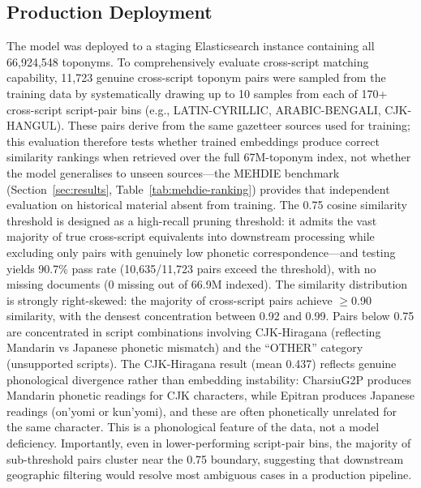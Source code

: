 \documentclass[11pt,a4paper]{article}
\begin{document}
\subsection{Production Deployment}

The model was deployed to a staging Elasticsearch instance containing all 66,924,548 toponyms. To comprehensively evaluate cross-script matching capability, 11,723 genuine cross-script toponym pairs were sampled from the training data by systematically drawing up to 10 samples from each of 170+ cross-script script-pair bins (e.g., LATIN-CYRILLIC, ARABIC-BENGALI, CJK-HANGUL). These pairs derive from the same gazetteer sources used for training; this evaluation therefore tests whether trained embeddings produce correct similarity rankings when retrieved over the full 67M-toponym index, not whether the model generalises to unseen sources---the MEHDIE benchmark (Section~\ref{sec:results}, Table~\ref{tab:mehdie-ranking}) provides that independent evaluation on historical material absent from training. The 0.75 cosine similarity threshold is designed as a high-recall pruning threshold: it admits the vast majority of true cross-script equivalents into downstream processing while excluding only pairs with genuinely low phonetic correspondence---and testing yields 90.7\% pass rate (10,635/11,723 pairs exceed the threshold), with no missing documents (0 missing out of 66.9M indexed). The similarity distribution is strongly right-skewed: the majority of cross-script pairs achieve $\geq$0.90 similarity, with the densest concentration between 0.92 and 0.99. Pairs below 0.75 are concentrated in script combinations involving CJK-Hiragana (reflecting Mandarin vs Japanese phonetic mismatch) and the ``OTHER'' category (unsupported scripts). The CJK-Hiragana result (mean 0.437) reflects genuine phonological divergence rather than embedding instability: CharsiuG2P produces Mandarin phonetic readings for CJK characters, while Epitran produces Japanese readings (on'yomi or kun'yomi), and these are often phonetically unrelated for the same character. This is a phonological feature of the data, not a model deficiency. Importantly, even in lower-performing script-pair bins, the majority of sub-threshold pairs cluster near the 0.75 boundary, suggesting that downstream geographic filtering would resolve most ambiguous cases in a production pipeline.
\end{document}
